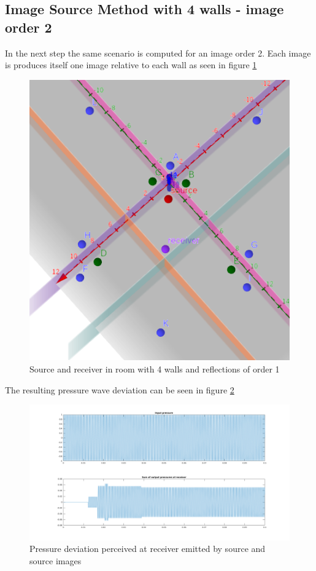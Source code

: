 \subsection{Image Source Method with 4 walls - image order 2}
In the next step the same scenario is computed for an image order 2. Each image is produces itself one image relative to each wall as seen in figure \ref{fig:ism_4_2_geo}\\
\begin{figure}
    \centerline{\includegraphics[width=1\textwidth,keepaspectratio]{LaTeX/images/geometrie/ism_4_walls_order_2.png}}
    \caption{Source and receiver in room with 4 walls and reflections of order 1}
    \label{fig:ism_4_2_geo}
\end{figure}
The resulting pressure wave deviation can be seen in figure \ref{fig:ism_4_2_mat}
\begin{figure}

    \centerline{\includegraphics[width=1.5\textwidth,keepaspectratio]{LaTeX/images/plots/matlab_4_walls_order_2.png}}
    \caption{Pressure deviation perceived at receiver emitted by source and source images}
    \label{fig:ism_4_2_mat}
\end{figure}
